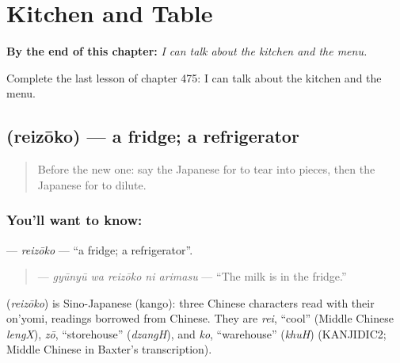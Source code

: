 
\chapter{Kitchen and Table}
\label{ch:ja-kitchen-and-table}

\begin{chapteropening}
\textbf{By the end of this chapter:} \emph{I can talk about the kitchen and the menu.}

Complete the last lesson of chapter 475: I can talk about the kitchen and the menu.
\end{chapteropening}

\section[\texorpdfstring{\ja{れいぞうこ} (reizōko)}{れいぞうこ (reizōko)}]{ (reizōko) — a fridge; a refrigerator}

\label{lesson:JA-C475-reizouko}



\begin{quote}
Before the new one: say the Japanese for to tear into pieces, then the Japanese for to dilute.
\end{quote}

\subsection*{You'll want to know: }
\textbf{} — \emph{reizōko} — \textquotedblleft{}a fridge; a refrigerator\textquotedblright{}.

\begin{quote}
\textbf{  } — \emph{gyūnyū wa reizōko ni arimasu} — \textquotedblleft{}The milk is in the fridge.\textquotedblright{}
\end{quote}

\begin{cousinweb}
\textbf{} (\emph{reizōko}) is Sino-Japanese (kango): three Chinese characters read with their on'yomi, readings borrowed from Chinese. They are \emph{rei}, \textquotedblleft{}cool\textquotedblright{} (Middle Chinese \emph{lengX}), \emph{zō}, \textquotedblleft{}storehouse\textquotedblright{} (\emph{dzangH}), and \emph{ko}, \textquotedblleft{}warehouse\textquotedblright{} (\emph{khuH}) (KANJIDIC2; Middle Chinese in Baxter's transcription).
\end{cousinweb}

